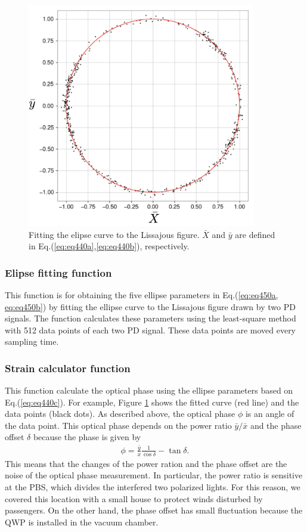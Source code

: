 \begin{figure}[h]
  \centering
  \includegraphics[width=10cm]{./img_chap4/img440.png}
  \caption{Fitting the elipse curve to the Lissajous figure. $\bar{X}$ and $\bar{y}$ are defined in Eq.(\ref{eq:eq440a},\ref{eq:eq440b}), respectively. } \label{img:img440}
\end{figure}

\subsubsection{Elipse fitting function}
This function is for obtaining the five ellipse parameters in Eq.(\ref{eq:eq450a, eq:eq450b}) by fitting the ellipse curve to the Lissajous figure drawn by two PD signals. The function calculates these parameters using the least-square method with 512 data points of each two PD signal. These data points are moved every sampling time.

\subsubsection{Strain calculator function}
This function calculate the optical phase using the ellipse parameters based on Eq.(\ref{eq:eq440c}). For example, Figure  \ref{img:img440} shows the fitted curve (red line) and the data points (black dots). As described above, the optical phase $\phi$ is an angle of the data point. This optical phase depends on the power ratio $\bar{y}/\bar{x}$ and the phase offset $\delta$ because the phase is given by
\begin{eqnarray}
  \phi = \frac{\bar{y}}{x}\frac{1}{\cos{\delta}} - \tan{\delta}.
\end{eqnarray}
This means that the changes of the power ration and the phase offset are the noise of the optical phase measurement. In particular, the power ratio is sensitive at the PBS, which divides the interfered two polarized lights. For this reason,  we covered this location with a small house to protect winds disturbed by passengers. On the other hand, the phase offset has small fluctuation because the QWP is installed in the vacuum chamber.

